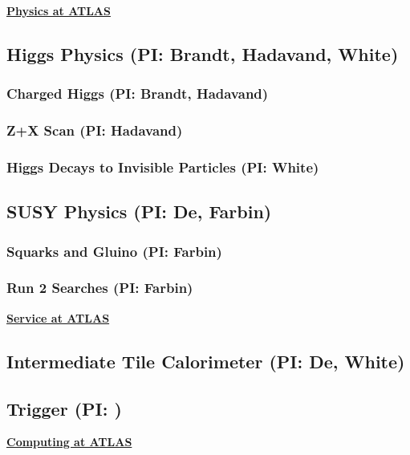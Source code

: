 \documentclass[11pt]{article}
\def\twohead#1{\subsection{#1}}
\def\threehead#1{\subsubsection{#1}}
\begin{document}
\begin{center}
\underline{\textbf{\huge Physics at ATLAS}}
\end{center}
\twohead{Higgs Physics (PI: Brandt, Hadavand, White)}



\threehead{Charged Higgs (PI: Brandt, Hadavand)}


\threehead{Z+X Scan (PI: Hadavand)}


\threehead{Higgs Decays to Invisible Particles (PI: White)}


\twohead{SUSY Physics (PI: De, Farbin)}



\threehead{Squarks and Gluino (PI: Farbin)}

\threehead{Run 2 Searches (PI: Farbin)}



\begin{center}
\underline{\textbf{\huge Service at ATLAS}}
\end{center}

\twohead{Intermediate Tile Calorimeter (PI: De, White)}


\twohead{Trigger (PI: )}



\begin{center}
\underline{\textbf{\huge Computing at ATLAS}}
\end{center}
\end{document}

